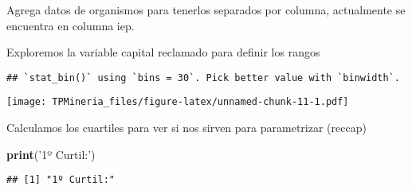 \documentclass[runningheads,a4paper]{llncs}
\newenvironment{Shaded}{}{}
\newcommand{\KeywordTok}[1]{\textcolor[rgb]{0.00,0.44,0.13}{\textbf{{#1}}}}
\newcommand{\DataTypeTok}[1]{\textcolor[rgb]{0.56,0.13,0.00}{{#1}}}
\newcommand{\StringTok}[1]{\textcolor[rgb]{0.25,0.44,0.63}{{#1}}}
\newcommand{\NormalTok}[1]{{#1}}
\newcommand{\OperatorTok}[1]{\textcolor[rgb]{0.40,0.40,0.40}{{#1}}}
\begin{document}
Agrega datos de organismos para tenerlos separados por columna,
actualmente se encuentra en columna iep.

\begin{Shaded}
\end{Shaded}

Exploremos la variable capital reclamado para definir los rangos

\begin{Shaded}
\end{Shaded}

\begin{verbatim}
## `stat_bin()` using `bins = 30`. Pick better value with `binwidth`.
\end{verbatim}

\texttt{[image: TPMineria\_files/figure-latex/unnamed-chunk-11-1.pdf]}

Calculamos los cuartiles para ver si nos sirven para parametrizar
(reccap)

\begin{Shaded}
\begin{Highlighting}[]
\KeywordTok{print}\NormalTok{(}\StringTok{'1º Curtil:'}\NormalTok{)}
\end{Highlighting}
\end{Shaded}

\begin{verbatim}
## [1] "1º Curtil:"
\end{verbatim}
\end{document}
